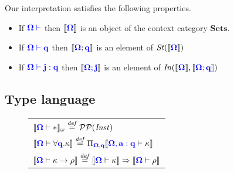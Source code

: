 \documentclass[sigplan,10pt,review,anonymous]{acmart}
\newcommand{\blum}[1]{\mathbf{\color{blue}{#1}}}
\newcommand{\defeq}{\overset{\mathit{def}}{=}}
\newcommand{\sem}[1]{\llbracket #1 \rrbracket}
\begin{document}
\begin{theorem} Our interpretation satisfies the following properties.
\begin{itemize}
\item If $\blum{\Omega \vdash}$ then $\sem{\blum{\Omega}}$ is an object of the context category $\mathbf{Sets}$.
\item If $\blum{\Omega \vdash q}$ then $\sem{\blum{\Omega};\blum{q}}$ is an element of $\mathit{St}(\sem{\blum{\Omega}})$
\item If $\blum{\Omega \vdash j : q}$ then $\sem{\blum{\Omega ; j}}$ is an element of $\mathit{In}(\sem{\blum{\Omega}}, \sem{\blum{\Omega ; q}})$
\end{itemize}
\end{theorem}

\subsection{Type language}


\begin{figure}
\begin{tabular}{l}
$\sem{\blum{\Omega} \vdash \ast}_\omega \defeq \mathcal P \mathcal P (\mathit{Inst})$\\
$\sem{\blum{\Omega} \vdash \forall \blum{q}. \kappa} \defeq \Pi_{\blum{\Omega},\blum{q}} \sem{\blum{\Omega, a : q} \vdash \kappa}$\\
$\sem{\blum{\Omega} \vdash \kappa \to \rho} \defeq \sem{\blum{\Omega} \vdash \kappa} \Rightarrow \sem{\blum{\Omega} \vdash \rho}$
\end{tabular}
\end{figure}
\end{document}
